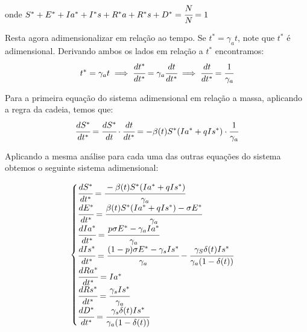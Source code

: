 \documentclass[12pt]{article}
\begin{document}
\noindent onde $S^* + E^* +Ia^*+I^*s+R^*a+R^*s+D^* = \cfrac{N}{N} = 1$

Resta agora adimensionalizar em relação ao tempo. Se $t^* = \gamma_a t$, note que $t^*$ é adimensional. Derivando ambos os lados em relação a $t^*$ encontramos:
$$t^* = \gamma_a t \implies \cfrac{dt^*}{dt^*} = \gamma_a \cfrac{dt}{dt^*} \implies \cfrac{dt}{dt^*} = \cfrac{1}{\gamma_a}$$

Para a primeira equação do sistema adimensional em relação a massa, aplicando a regra da cadeia, temos que:
$$\cfrac{dS^*}{dt^*} = \cfrac{dS^*}{dt} \cdot  \cfrac{dt}{dt^*} = -\beta(t)S^*(Ia^* + qIs^*) \cdot \cfrac{1}{\gamma_a}$$

Aplicando a mesma análise para cada uma das outras equações do sistema obtemos o seguinte sistema adimensional:

\begin{center}
$$
\begin{cases}
\cfrac{dS^*}{dt^*} = \cfrac{-\beta(t)S^*(Ia^* + qIs^*)}{\gamma_a} \\
\cfrac{dE^*}{dt^*}  = \cfrac{\beta(t)S^*(Ia^* + qIs^*) - \sigma E^* }{\gamma_a}\\
\cfrac{dIa^*}{dt^*}  = \cfrac{p\sigma E^* - \gamma_aIa^*}{\gamma_a}\\
\cfrac{dIs^*}{dt^*}  = \cfrac{(1-p)\sigma E^* - \gamma_sIs^*}{\gamma_a} - \cfrac{\gamma_S \delta (t)Is^*}{\gamma_a(1 - \delta(t))}\\
\cfrac{dRa^*}{dt^*}  = Ia^*\\
\cfrac{dRs^*}{dt^*}  = \cfrac{\gamma_sIs^*}{\gamma_a}\\
\cfrac{dD^*}{dt^*}  = \cfrac{\gamma_s \delta (t)Is^*}{\gamma_a(1 - \delta(t))}

\end{cases}
$$
\end{center}



\end{document}
